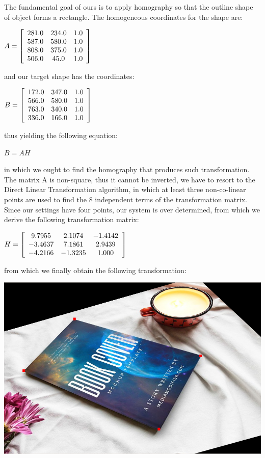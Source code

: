 \documentclass[]{article}
\begin{document}
The fundamental goal of ours is to apply homography so that the outline shape of object forms a rectangle. The homogeneous coordinates for the shape are:

\centerline {
	$A = \left[ {\begin{array}{*{20}c}
		281.0 & 234.0 & 1.0 \\
		587.0 & 580.0 & 1.0 \\
		808.0 & 375.0 & 1.0 \\
		506.0 & 45.0 & 1.0
		\end{array} } \right]$
}

and our target shape has the coordinates: 

\centerline {
	$B = \left[ {\begin{array}{*{20}c}
		172.0 & 347.0 & 1.0 \\
		566.0 & 580.0 & 1.0 \\
		763.0 & 340.0 & 1.0 \\
		336.0 & 166.0 & 1.0
		\end{array} } \right]$
}

thus yielding the following equation: 

\centerline {
	$B = AH$
}


in which we ought to find the homography that produces such transformation. The matrix A is non-square, thus it cannot be inverted, we have to resort to the Direct Linear Transformation algorithm, in which at least three non-co-linear points are used to find the 8 independent terms of the transformation matrix. Since our settings have four points, our system is over determined, from which we derive the following transformation matrix:

\vspace{0.5em}

\centerline {
	$H = \left[ {\begin{array}{*{20}c}
		9.7955 & 2.1074 & -1.4142 \\
		-3.4637 & 7.1861 & 2.9439 \\
		-4.2166 & -1.3235 & 1.000
		\end{array} } \right] $
}

\vspace{0.5em}

from which we finally obtain the following transformation:

\vspace{0.5em}
\centerline {
	\includegraphics[scale=0.4]{out}
}
\end{document}
